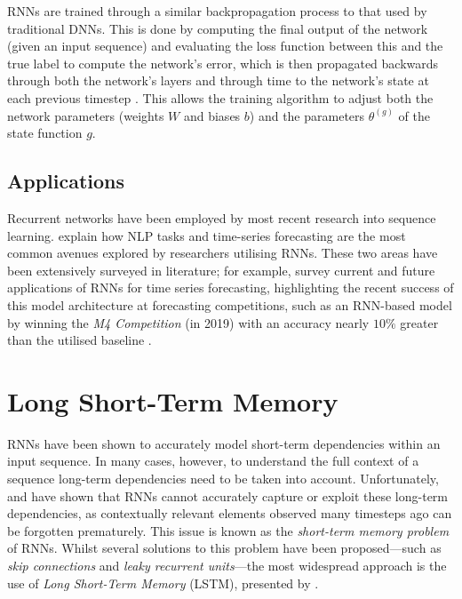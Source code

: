 \documentclass[a4paper, 11pt]{report}
\begin{document}
    RNNs are trained through a similar backpropagation process to that used by traditional DNNs. This is done by computing the final output of the network (given an input sequence) and evaluating the loss function between this and the true label to compute the network's error, which is then propagated backwards through both the network's layers and through time to the network's state at each previous timestep \citep{zhang-2021}. This allows the training algorithm to adjust both the network parameters (weights $W$ and biases $b$) and the parameters $\theta^{(g)}$ of the state function $g$.


    \subsection{Applications}

    Recurrent networks have been employed by most recent research into sequence learning. \citet{lipton-2015} explain how NLP tasks and time-series forecasting are the most common avenues explored by researchers utilising RNNs. These two areas have been extensively surveyed in literature; for example, \citet{hewamalage-2021} survey current and future applications of RNNs for time series forecasting, highlighting the recent success of this model architecture at forecasting competitions, such as an RNN-based model by \citet{smyl-2020} winning the \emph{M4 Competition} (in 2019) with an accuracy nearly $10\%$ greater than the utilised baseline \citep{makridakis-2020}.


    \section{Long Short-Term Memory}

    RNNs have been shown to accurately model short-term dependencies within an input sequence. In many cases, however, to understand the full context of a sequence long-term dependencies need to be taken into account. Unfortunately, \citet{hochreiter-1991} and \citet{bengio-1994} have shown that RNNs cannot accurately capture or exploit these long-term dependencies, as contextually relevant elements observed many timesteps ago can be forgotten prematurely. This issue is known as the \emph{short-term memory problem} of RNNs. Whilst several solutions to this problem have been proposed---such as \emph{skip connections} and \emph{leaky recurrent units}---the most widespread approach is the use of \emph{Long Short-Term Memory} (LSTM), presented by \citet{hochreiter-1997}.
\end{document}
